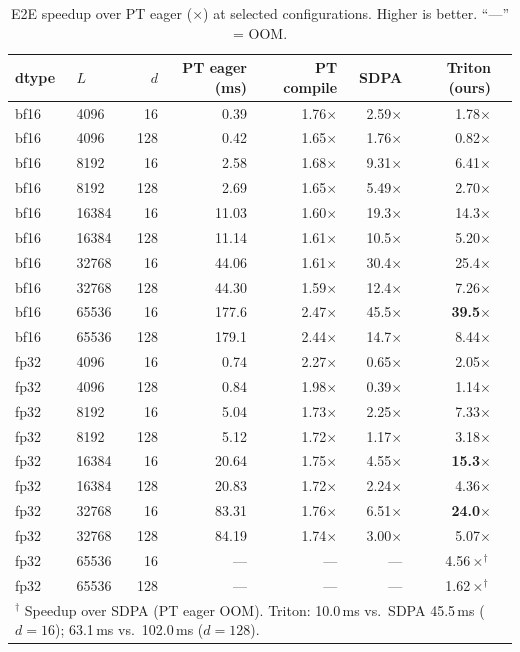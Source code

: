 \documentclass[11pt]{article}
\begin{document}
\begin{table}[H]\small\centering
\caption{E2E speedup over PT eager ($\times$) at selected configurations.
  Higher is better. ``---'' = OOM.}
\label{tab:fa2-speedup}
\begin{tabular}{ll rr rrrr}
\toprule
dtype & $L$ & $d$ & PT eager (ms) & PT compile & SDPA & Triton (ours) \\
\midrule
bf16 & 4096  & 16  & 0.39  & 1.76$\times$ & 2.59$\times$ & 1.78$\times$ \\
bf16 & 4096  & 128 & 0.42  & 1.65$\times$ & 1.76$\times$ & 0.82$\times$ \\
bf16 & 8192  & 16  & 2.58  & 1.68$\times$ & 9.31$\times$ & 6.41$\times$ \\
bf16 & 8192  & 128 & 2.69  & 1.65$\times$ & 5.49$\times$ & 2.70$\times$ \\
bf16 & 16384 & 16  & 11.03 & 1.60$\times$ & 19.3$\times$ & 14.3$\times$ \\
bf16 & 16384 & 128 & 11.14 & 1.61$\times$ & 10.5$\times$ & 5.20$\times$ \\
bf16 & 32768 & 16  & 44.06 & 1.61$\times$ & 30.4$\times$ & 25.4$\times$ \\
bf16 & 32768 & 128 & 44.30 & 1.59$\times$ & 12.4$\times$ & 7.26$\times$ \\
bf16 & 65536 & 16  & 177.6 & 2.47$\times$ & 45.5$\times$ & \textbf{39.5$\times$} \\
bf16 & 65536 & 128 & 179.1 & 2.44$\times$ & 14.7$\times$ & 8.44$\times$ \\
\midrule
fp32 & 4096  & 16  & 0.74  & 2.27$\times$ & 0.65$\times$ & 2.05$\times$ \\
fp32 & 4096  & 128 & 0.84  & 1.98$\times$ & 0.39$\times$ & 1.14$\times$ \\
fp32 & 8192  & 16  & 5.04  & 1.73$\times$ & 2.25$\times$ & 7.33$\times$ \\
fp32 & 8192  & 128 & 5.12  & 1.72$\times$ & 1.17$\times$ & 3.18$\times$ \\
fp32 & 16384 & 16  & 20.64 & 1.75$\times$ & 4.55$\times$ & \textbf{15.3$\times$} \\
fp32 & 16384 & 128 & 20.83 & 1.72$\times$ & 2.24$\times$ & 4.36$\times$ \\
fp32 & 32768 & 16  & 83.31 & 1.76$\times$ & 6.51$\times$ & \textbf{24.0$\times$} \\
fp32 & 32768 & 128 & 84.19 & 1.74$\times$ & 3.00$\times$ & 5.07$\times$ \\
fp32 & 65536 & 16  & ---   & ---          & ---          & 4.56$\times^\dagger$ \\
fp32 & 65536 & 128 & ---   & ---          & ---          & 1.62$\times^\dagger$ \\
\bottomrule
\multicolumn{7}{l}{\footnotesize $^\dagger$ Speedup over SDPA (PT eager OOM).
  Triton: 10.0\,ms vs.\ SDPA 45.5\,ms ($d{=}16$); 63.1\,ms vs.\ 102.0\,ms ($d{=}128$).}
\end{tabular}
\end{table}
\end{document}
